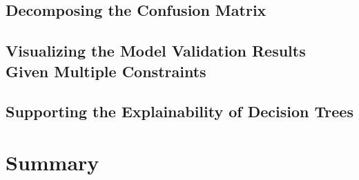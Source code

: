 \documentclass[11pt,a4paper, DIV=12]{report}
\begin{document}
        \subsection{Decomposing the Confusion Matrix}    
            
            \label{section_confusion_matrix_decomposition}

        \subsection{Visualizing the Model Validation Results Given Multiple Constraints}
            
            \label{section_visualizing_multiple_constraint_validation_results}
            
        \subsection{Supporting the Explainability of Decision Trees}
            
            \label{section_constraint_decision_tree_visualization}
    \section{Summary}
        
    
        
        
\end{document}
